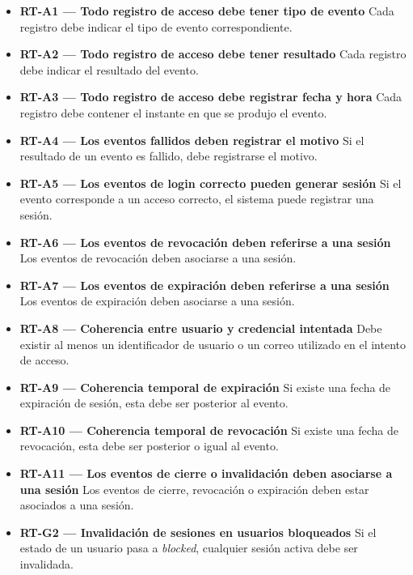 \begin{itemize}

      \item \textbf{RT-A1 — Todo registro de acceso debe tener tipo de evento}
            Cada registro debe indicar el tipo de evento correspondiente.
      \item \textbf{RT-A2 — Todo registro de acceso debe tener resultado}
            Cada registro debe indicar el resultado del evento.
      \item \textbf{RT-A3 — Todo registro de acceso debe registrar fecha y hora}
            Cada registro debe contener el instante en que se produjo el evento.
      \item \textbf{RT-A4 — Los eventos fallidos deben registrar el motivo}
            Si el resultado de un evento es fallido, debe registrarse el motivo.
      \item \textbf{RT-A5 — Los eventos de login correcto pueden generar sesión}
            Si el evento corresponde a un acceso correcto, el sistema puede registrar una sesión.
      \item \textbf{RT-A6 — Los eventos de revocación deben referirse a una sesión}
            Los eventos de revocación deben asociarse a una sesión.
      \item \textbf{RT-A7 — Los eventos de expiración deben referirse a una sesión}
            Los eventos de expiración deben asociarse a una sesión.
      \item \textbf{RT-A8 — Coherencia entre usuario y credencial intentada}
            Debe existir al menos un identificador de usuario o un correo utilizado en el intento de acceso.
      \item \textbf{RT-A9 — Coherencia temporal de expiración}
            Si existe una fecha de expiración de sesión, esta debe ser posterior al evento.
      \item \textbf{RT-A10 — Coherencia temporal de revocación}
            Si existe una fecha de revocación, esta debe ser posterior o igual al evento.
      \item \textbf{RT-A11 — Los eventos de cierre o invalidación deben asociarse a una sesión}
            Los eventos de cierre, revocación o expiración deben estar asociados a una sesión.
      \item \textbf{RT-G2 — Invalidación de sesiones en usuarios bloqueados}
            Si el estado de un usuario pasa a \textit{blocked}, cualquier sesión activa debe ser invalidada.

\end{itemize}


